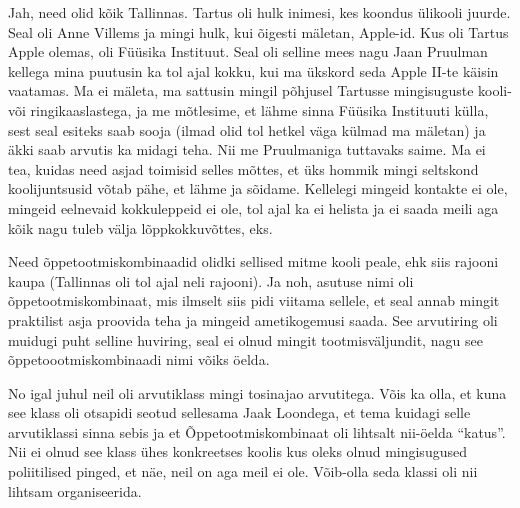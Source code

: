 Jah, need olid kõik Tallinnas. Tartus oli hulk inimesi, kes koondus ülikooli juurde. Seal oli Anne Villems ja mingi hulk, kui õigesti mäletan,  Apple-id. Kus oli Tartus Apple olemas, oli Füüsika Instituut. Seal oli selline mees nagu Jaan Pruulman kellega mina puutusin ka tol ajal  kokku, kui  ma ükskord seda Apple II-te käisin vaatamas. Ma ei mäleta, ma sattusin mingil põhjusel Tartusse mingisuguste kooli- või ringikaaslastega, ja  me mõtlesime, et lähme sinna Füüsika Instituuti külla, sest seal esiteks saab sooja (ilmad olid tol hetkel väga külmad ma mäletan) ja äkki saab arvutis ka midagi teha. Nii me Pruulmaniga tuttavaks saime. Ma ei tea, kuidas need asjad toimisid selles mõttes, et üks hommik mingi seltskond koolijuntsusid võtab pähe, et lähme ja sõidame. Kellelegi mingeid kontakte ei ole, mingeid eelnevaid kokkuleppeid ei ole, tol ajal ka ei helista ja ei saada meili aga kõik nagu tuleb välja lõppkokkuvõttes, eks.

\label{content!OTK}

Need õppetootmiskombinaadid olidki sellised mitme kooli peale, ehk siis rajooni kaupa (Tallinnas oli tol ajal neli rajooni). Ja noh, asutuse nimi oli õppetootmiskombinaat, mis ilmselt siis pidi viitama sellele, et seal annab mingit praktilist asja proovida teha ja mingeid ametikogemusi saada. See arvutiring oli muidugi puht selline huviring, seal ei olnud mingit  tootmisväljundit, nagu see õppetoootmiskombinaadi nimi võiks öelda.


No igal juhul neil oli arvutiklass mingi tosinajao arvutitega. Võis ka olla, et kuna see klass oli otsapidi seotud sellesama Jaak Loondega, et tema kuidagi selle arvutiklassi sinna sebis ja et Õppetootmiskombinaat oli lihtsalt nii-öelda \enquote{katus}. Nii  ei olnud see klass ühes konkreetses koolis kus oleks olnud mingisugused poliitilised pinged, et näe, neil on aga meil ei ole. Võib-olla seda klassi oli nii lihtsam organiseerida. 


